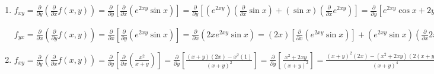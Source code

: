 \begin{Answer}
\begin{enumerate}
    \item $f_{xy} = \frac{\partial}{\partial y} \left( 
    \frac{\partial}{\partial x} f(x, y) \right) = \frac{\partial}{\partial y} 
    \left[ \frac{\partial}{\partial x} \left( e^{2xy} \sin{x} \right) \right] 
    = \frac{\partial}{\partial y} \left[ \left(e^{2xy} \right) \left( 
    \frac{\partial}{\partial x}\sin{x} \right) + \left( \sin{x} \right) \left( 
    \frac{\partial}{\partial x} e^{2xy} \right) \right] = 
    \frac{\partial}{\partial y} \left[ e^{2xy}\cos{x} + 2ye^{2xy}\sin{x} 
    \right] = \frac{\partial}{\partial y} \left( e^{2xy} \cos{x} \right) + 
    \frac{\partial}{\partial y} \left( 2ye^{2xy} \sin{x} \right) = 2xe^{2xy}
    \cos{x} + \left( 2y \right) \left( \frac{\partial}{\partial y}e^{2xy}
    \sin{x} \right) + \left(e^{2xy} \sin{x} \right) \left( 
    \frac{\partial}{\partial y} 2y \right) = 2xe^{2xy}\cos{x} + 4xye^{2xy}
    \sin{x} + 2e^{2xy}\sin{x}$

    $f_{yx} = \frac{\partial}{\partial x} \left( \frac{\partial}{\partial y} 
    f(x, y) \right) = \frac{\partial}{\partial x} \left[ \frac{\partial}{
    \partial y} \left(e^{2xy} \sin{x} \right) \right] = \frac{\partial}{
    \partial x} \left( 2xe^{2xy} \sin{x} \right) = \left(2x \right) \left[ 
    \frac{\partial}{\partial x} \left( e^{2xy} \sin{x} \right) \right] + \left(
    e^{2xy} \sin{x} \right) \left( \frac{\partial}{\partial x} 2x \right) = 
    \left(2x \right) \left[ \left( e^{2xy} \right) \left( \frac{\partial}{
    \partial x} \sin{x} \right) + \left( \sin{x} \right) \left( \frac{
    \partial}{\partial x}e^{2xy} \right) \right] + 2e^{2xy}\sin{x} = 2xe^{2xy}
    \cos{x} + 4xye^{2xy}\sin{x} + 2e^{2xy}\sin{x} = f_{xy}$

    \item $f_{xy} = \frac{\partial}{\partial y} \left( \frac{\partial}{
    \partial x}f(x, y) \right) = \frac{\partial}{\partial y} \left[ \frac{
    \partial}{\partial x} \left( \frac{x^2}{x + y} \right) \right] = \frac{
    \partial}{\partial y} \left[ \frac{(x + y) \left( 2x \right) - x^2 \left(
    1 \right)}{\left( x + y \right)^2} \right] = \frac{\partial}{\partial y} 
    \left[ \frac{x^2 + 2xy}{\left( x + y \right)^2} \right] = \frac{\left( x + 
    y \right)^2 \left( 2x \right) - \left( x^2 + 2xy \right) \left(2(x + y) 
    \right)}{\left( x + y \right)^4} = \frac{\left( x^2 + 2xy + y^2 \right) 
    \left( 2x \right) - \left( x^2 + 2xy \right) \left( 2x + 2y \right)}{\left(
    x + y \right)^4} = \frac{2x^3 + 4x^2y + 2xy^2 - 2x^3 - 2x^2y - 4x^2y - 
    4xy^2}{\left( x + y \right)^4} = \frac{-2x^2y - 2xy^2}{\left( x + y \right)
    ^4}$


\end{enumerate}
\end{Answer}
